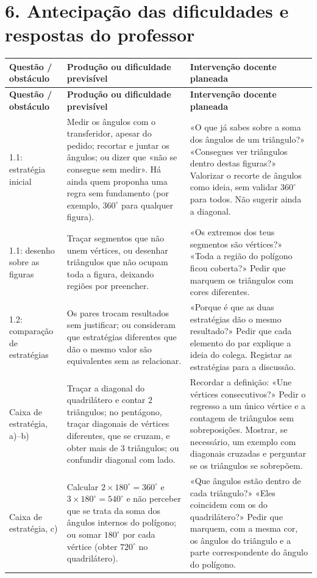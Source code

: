 \section*{6. Antecipação das dificuldades e respostas do professor}
\begingroup\small
\renewcommand{\arraystretch}{1.22}
\begin{longtable}{|p{2.55cm}|p{5.7cm}|p{6.65cm}|}
\hline
\rowcolor{azulClaro}\textbf{Questão / obstáculo}&\textbf{Produção ou dificuldade previsível}&\textbf{Intervenção docente planeada}\\\hline
\endfirsthead
\hline\rowcolor{azulClaro}\textbf{Questão / obstáculo}&\textbf{Produção ou dificuldade previsível}&\textbf{Intervenção docente planeada}\\\hline
\endhead
1.1: estratégia inicial&Medir os ângulos com o transferidor, apesar do pedido; recortar e juntar os ângulos; ou dizer que «não se consegue sem medir». Há ainda quem proponha uma regra sem fundamento (por exemplo, $360^\circ$ para qualquer figura).&«O que já sabes sobre a soma dos ângulos de um triângulo?» «Consegues ver triângulos dentro destas figuras?» Valorizar o recorte de ângulos como ideia, sem validar $360^\circ$ para todos. Não sugerir ainda a diagonal.\\\hline
1.1: desenho sobre as figuras&Traçar segmentos que não unem vértices, ou desenhar triângulos que não ocupam toda a figura, deixando regiões por preencher.&«Os extremos dos teus segmentos são vértices?» «Toda a região do polígono ficou coberta?» Pedir que marquem os triângulos com cores diferentes.\\\hline
1.2: comparação de estratégias&Os pares trocam resultados sem justificar; ou consideram que estratégias diferentes que dão o mesmo valor são equivalentes sem as relacionar.&«Porque é que as duas estratégias dão o mesmo resultado?» Pedir que cada elemento do par explique a ideia do colega. Registar as estratégias para a discussão.\\\hline
Caixa de estratégia, a)--b)&Traçar a diagonal do quadrilátero e contar 2 triângulos; no pentágono, traçar diagonais de vértices diferentes, que se cruzam, e obter mais de 3 triângulos; ou confundir diagonal com lado.&Recordar a definição: «Une vértices consecutivos?» Pedir o regresso a um único vértice e a contagem de triângulos sem sobreposições. Mostrar, se necessário, um exemplo com diagonais cruzadas e perguntar se os triângulos se sobrepõem.\\\hline
Caixa de estratégia, c)&Calcular $2\times180^\circ=360^\circ$ e $3\times180^\circ=540^\circ$ e não perceber que se trata da soma dos ângulos internos do polígono; ou somar $180^\circ$ por cada vértice (obter $720^\circ$ no quadrilátero).&«Que ângulos estão dentro de cada triângulo?» «Eles coincidem com os do quadrilátero?» Pedir que marquem, com a mesma cor, os ângulos do triângulo e a parte correspondente do ângulo do polígono.\\\hline

\end{longtable}
